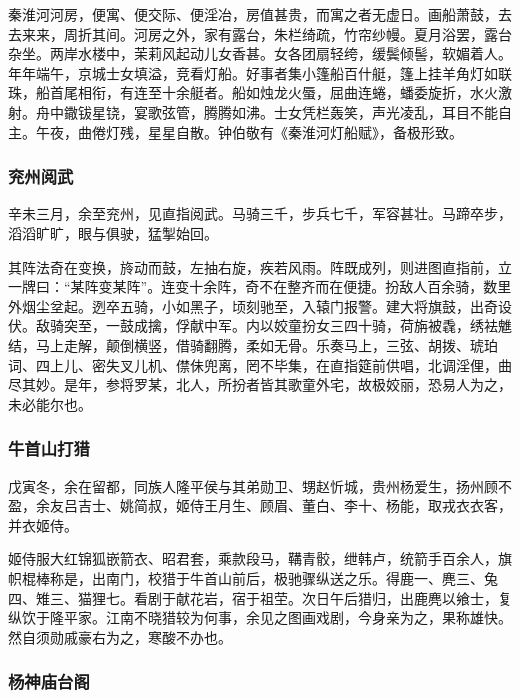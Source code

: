 \documentclass[]{article}
\begin{document}
秦淮河河房，便寓、便交际、便淫冶，房值甚贵，而寓之者无虚日。画船萧鼓，去去来来，周折其间。河房之外，家有露台，朱栏绮疏，竹帘纱幔。夏月浴罢，露台杂坐。两岸水楼中，茉莉风起动儿女香甚。女各团扇轻绔，缓鬓倾髻，软媚着人。年年端午，京城士女填溢，竞看灯船。好事者集小篷船百什艇，篷上挂羊角灯如联珠，船首尾相衔，有连至十余艇者。船如烛龙火蜃，屈曲连蜷，蟠委旋折，水火激射。舟中鏾钹星铙，宴歌弦管，腾腾如沸。士女凭栏轰笑，声光凌乱，耳目不能自主。午夜，曲倦灯残，星星自散。钟伯敬有《秦淮河灯船赋》，备极形致。

\hypertarget{header-n287}{%
\subsubsection{兖州阅武}\label{header-n287}}

辛未三月，余至兖州，见直指阅武。马骑三千，步兵七千，军容甚壮。马蹄卒步，滔滔旷旷，眼与俱驶，猛掣始回。

其阵法奇在变换，旍动而鼓，左抽右旋，疾若风雨。阵既成列，则进图直指前，立一牌曰：``某阵变某阵''。连变十余阵，奇不在整齐而在便捷。扮敌人百余骑，数里外烟尘坌起。迾卒五骑，小如黑子，顷刻驰至，入辕门报警。建大将旗鼓，出奇设伏。敌骑突至，一鼓成擒，俘献中军。内以姣童扮女三四十骑，荷旃被毳，绣袪魋结，马上走解，颠倒横竖，借骑翻腾，柔如无骨。乐奏马上，三弦、胡拨、琥珀词、四上儿、密失叉儿机、僸佅兜离，罔不毕集，在直指筵前供唱，北调淫俚，曲尽其妙。是年，参将罗某，北人，所扮者皆其歌童外宅，故极姣丽，恐易人为之，未必能尔也。

\hypertarget{header-n292}{%
\subsubsection{牛首山打猎}\label{header-n292}}

戊寅冬，余在留都，同族人隆平侯与其弟勋卫、甥赵忻城，贵州杨爱生，扬州顾不盈，余友吕吉士、姚简叔，姬侍王月生、顾眉、董白、李十、杨能，取戎衣衣客，并衣姬侍。

姬侍服大红锦狐嵌箭衣、昭君套，乘款段马，鞲青骹，绁韩卢，统箭手百余人，旗帜棍棒称是，出南门，校猎于牛首山前后，极驰骤纵送之乐。得鹿一、麂三、兔四、雉三、猫狸七。看剧于献花岩，宿于祖茔。次日午后猎归，出鹿麂以飨士，复纵饮于隆平家。江南不晓猎较为何事，余见之图画戏剧，今身亲为之，果称雄快。然自须勋戚豪右为之，寒酸不办也。

\hypertarget{header-n297}{%
\subsubsection{杨神庙台阁}\label{header-n297}}
\end{document}
